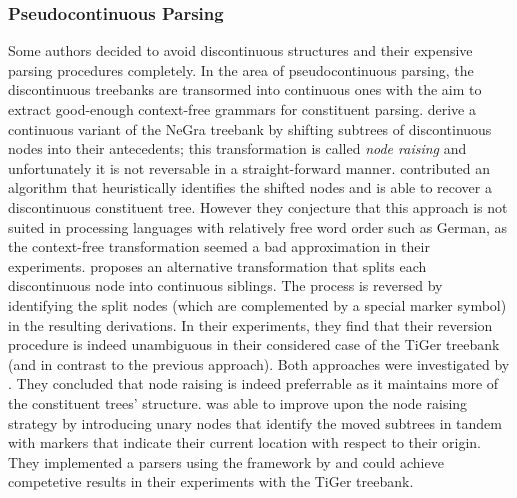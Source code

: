 \documentclass[../document.tex]{subfiles}
\begin{document}
    \subsubsection*{Pseudocontinuous Parsing}
    Some authors decided to avoid discontinuous structures and their expensive parsing procedures completely.
    In the area of pseudocontinuous parsing, the discontinuous treebanks are transormed into continuous ones with the aim to extract good-enough context-free grammars for constituent parsing.
    \citet{DubKel03} derive a continuous variant of the NeGra treebank by shifting subtrees of discontinuous nodes into their antecedents; this transformation is called \emph{node raising} and unfortunately it is not reversable in a straight-forward manner.
    \citet{levy-manning-2004-deep} contributed an algorithm that heuristically identifies the shifted nodes and is able to recover a discontinuous constituent tree.
    However they conjecture that this approach is not suited in processing languages with relatively free word order such as German, as the context-free transformation seemed a bad approximation in their experiments.
    \citet{boyd-2007-discontinuity} proposes an alternative transformation that splits each discontinuous node into continuous siblings.
    The process is reversed by identifying the split nodes (which are complemented by a special marker symbol) in the resulting derivations.
    In their experiments, they find that their reversion procedure is indeed unambiguous in their considered case of the TiGer treebank (and in contrast to the previous approach).
    Both approaches were investigated by \citet{hsu2010comparing}.
    They concluded that node raising is indeed preferrable as it maintains more of the constituent trees' structure.
    \citet{Ver16} was able to improve upon the node raising strategy by introducing unary nodes that identify the moved subtrees in tandem with markers that indicate their current location with respect to their origin.
    They implemented a parsers using the  framework by \citet{Petrov06} and could achieve competetive results in their experiments with the TiGer treebank.
    
    
\end{document}

